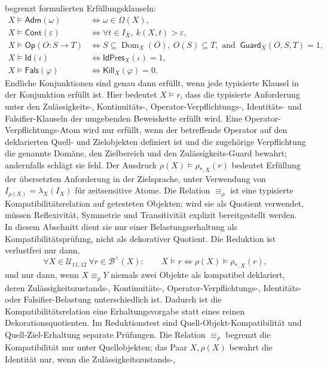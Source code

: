 begrenzt formulierten Erfüllungsklauseln:
\[
\begin{aligned}
X\models\mathsf{Adm}(\omega) &\Longleftrightarrow
  \omega\in\Omega(X),\\
X\models\mathsf{Cont}(\varepsilon) &\Longleftrightarrow
  \forall t\in I_X,\ k(X,t)>\varepsilon,\\
X\models\mathsf{Op}(O:S\to T) &\Longleftrightarrow
  S\subseteq\operatorname{Dom}_X(O),\ O(S)\subseteq T,\text{ and }\
  \mathsf{Guard}_X(O,S,T)=1,\\
X\models\mathsf{Id}(\iota) &\Longleftrightarrow
  \mathsf{IdPres}_X(\iota)=1,\\
X\models\mathsf{Fals}(\varphi) &\Longleftrightarrow
  \mathsf{Kill}_X(\varphi)=0.
\end{aligned}
\]
Endliche Konjunktionen sind genau dann erfüllt, wenn jede typisierte Klausel in der Konjunktion erfüllt ist.
Hier bedeutet \(X\models r\), dass die typisierte Anforderung unter den Zulässigkeits-, Kontinuitäts-,
Operator-Verpflichtungs-, Identitäts- und Falsifier-Klauseln der umgebenden Beweiskette erfüllt wird. Eine
Operator-Verpflichtungs-Atom wird nur erfüllt, wenn der betreffende Operator auf den deklarierten Quell- und
Zielobjekten definiert ist und die zugehörige Verpflichtung die genannte Domäne, den Zielbereich und den
Zulässigkeits-Guard bewahrt; andernfalls schlägt sie fehl. Der Ausdruck
\(\rho(X)\models\rho_{\ast,X}(r)\) bedeutet Erfüllung der übersetzten Anforderung in der Zielsprache, unter
Verwendung von \(I_{\rho(X)}=\lambda_X(I_X)\) für zeitsensitive Atome. Die Relation
\(\equiv_{\rho}\) ist eine typisierte Kompatibilitätsrelation auf getesteten Objekten; wird sie als Quotient
verwendet, müssen Reflexivität, Symmetrie und Transitivität explizit bereitgestellt werden. In diesem
Abschnitt dient sie nur einer Belastungserhaltung als Kompatibilitätsprüfung, nicht als dekorativer
Quotient. Die Reduktion ist verlustfrei nur dann,
\[
  \forall X\in\mathcal{U}_{11,12}\ \forall r\in\mathcal{B}^{\wedge}(X):
  \qquad X\models r \Longleftrightarrow \rho(X)\models \rho_{\ast,X}(r),
\]
und nur dann, wenn \(X\equiv_{\rho}Y\) niemals zwei Objekte als kompatibel deklariert, deren
Zulässigkeitszustands-, Kontinuitäts-, Operator-Verpflichtungs-, Identitäts- oder Falsifier-Belastung
unterschiedlich ist. Dadurch ist die Kompatibilitätsrelation eine Erhaltungsvorgabe statt eines reinen
Dekorationsquotienten. Im Reduktionstest sind Quell-Objekt-Kompatibilität und
Quell-Ziel-Erhaltung separate Prüfungen. Die Relation \(\equiv_{\rho}\) begrenzt die Kompatibilität nur unter
Quellobjekten; das Paar \(X,\rho(X)\) bewahrt die Identität nur, wenn die Zulässigkeitszustands-,
